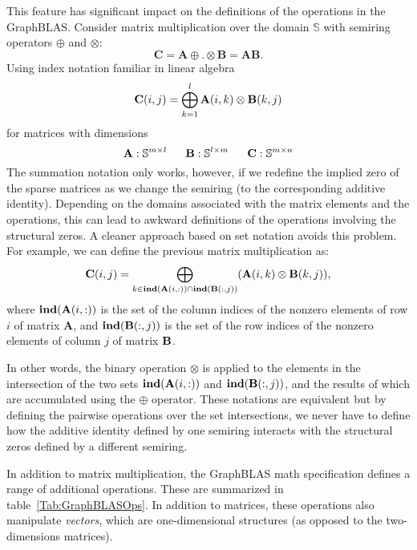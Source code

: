 This feature has significant impact on the definitions of the operations in the GraphBLAS.   
Consider matrix multiplication over the domain $\mathbb{S}$ 
with semiring operators 
$\oplus$ and $\otimes$:
 $$
   \mathbf{C} = \mathbf{A} {\oplus}.{\otimes} \mathbf{B} = \mathbf{A} \mathbf{B}.
$$
Using index notation familiar in linear algebra
  $$
   {\bf C}(i,j) = \bigoplus_{k=1}^l {\bf A}(i,k) \otimes {\bf B}(k,j)
  $$
for matrices with dimensions
$$
  {\bf A} : \mathbb{S}^{m \times l} ~~~~~
  {\bf B} : \mathbb{S}^{l \times m} ~~~~~
  {\bf C} : \mathbb{S}^{m \times n}
$$
The summation notation only works, however, if we redefine the implied zero of the 
sparse matrices as we change the semiring (to the corresponding additive identity).   Depending on the domains associated with the
matrix elements and the operations, this can lead to awkward definitions of the
operations involving the structural zeros.  A cleaner approach based on set notation
avoids this problem.  For example, we can define the previous matrix multiplication
as:   
$$
\mathbf{C}(i,j)
= \bigoplus_{k \in \mathbf{ind}({\bf {A}}(i,:)) \cap
\mathbf{ind}({\bf {B}}(:,j))} ({\bf {A}}(i,k)
\otimes {\bf {B}}(k,j)),
$$ 
where $\mathbf{ind}({\bf {A}}(i,:))$ is the set of the column indices of the 
nonzero elements of row $i$ of matrix $\mathbf{A}$, and
$\mathbf{ind}({\bf {B}}(:,j))$ is the set of the row indices of the 
nonzero elements of column $j$ of matrix ${\bf B}$.

In other words, the binary operation $\otimes$ is applied to the elements in the intersection of the 
two sets $\mathbf{ind}({\bf {A}}(i,:))$ and $\mathbf{ind}({\bf {B}}(:,j))$, and the results of which are accumulated using the $\oplus$ operator.
These notations are equivalent but by defining the pairwise operations over
the set intersections, we never have to define how the additive identity defined by one
semiring interacts with the structural zeros defined by a different semiring.

In addition to matrix multiplication, the GraphBLAS math specification defines
a range of additional operations.  These are summarized in table~\ref{Tab:GraphBLASOps}.
In addition to matrices, these operations also manipulate \emph{vectors}, which are
one-dimensional structures (as opposed to the two-dimensions matrices).


